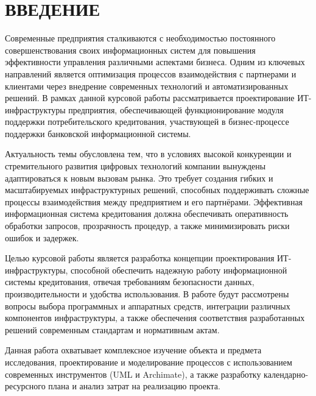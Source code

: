 \documentclass[14pt, a4paper]{extarticle}
\begin{document}
\def\contentsname{СОДЕРЖАНИЕ}

%  
%  
\setcounter{page}{4}
\tableofcontents

\section*{ВВЕДЕНИЕ}
{}

Современные предприятия сталкиваются с необходимостью постоянного
совершенствования своих информационных систем для повышения
эффективности управления различными аспектами бизнеса. Одним из
ключевых направлений является оптимизация процессов взаимодействия с
партнерами и клиентами через внедрение современных технологий и
автоматизированных решений. В рамках данной курсовой работы
рассматривается проектирование ИТ-инфраструктуры предприятия, 
обеспечивающей функционирование модуля поддержки потребительского 
кредитования, участвующей в бизнес-процессе поддержки банковской 
информационной системы.

Актуальность темы обусловлена тем, что в условиях высокой конкуренции
и стремительного развития цифровых технологий компании вынуждены
адаптироваться к новым вызовам рынка. Это требует создания гибких и
масштабируемых инфраструктурных решений, способных поддерживать
сложные процессы взаимодействия между предприятием и его
партнёрами. Эффективная информационная система кредитования
должна обеспечивать оперативность обработки запросов, прозрачность
процедур, а также минимизировать риски ошибок и задержек.

Целью курсовой работы является разработка концепции проектирования
ИТ-инфраструктуры, способной обеспечить надежную работу информационной
системы кредитования, отвечая требованиям безопасности данных,
производительности и удобства использования. В работе будут
рассмотрены вопросы выбора программных и аппаратных средств,
интеграции различных компонентов инфраструктуры, а также обеспечения
соответствия разработанных решений современным стандартам и
нормативным актам.

Данная работа охватывает комплексное изучение объекта и предмета
исследования, проектирование и моделирование процессов с
использованием современных инструментов (UML и Archimate), а также
разработку календарно-ресурсного плана и анализ затрат на реализацию
проекта.
\end{document}
